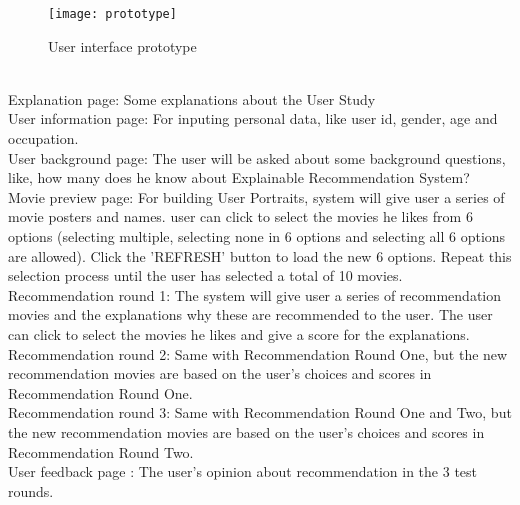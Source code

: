 \begin{figure}[h]
\caption{User interface prototype}
\label{figure:12}
\centering
\texttt{[image: prototype]}
\end{figure}
\leavevmode\\
Explanation page: Some explanations about the User Study \\
User information page: For inputing personal data, like user id, gender, age and occupation.\\
User background page: The user will be asked about some background questions, like, how many does he know about Explainable Recommendation System?\\
Movie preview page: For building User Portraits, system will give user a series of movie posters and names. user can click to select the movies he likes from 6 options (selecting multiple, selecting none in 6 options and selecting all 6 options are allowed). Click the 'REFRESH' button to load the new 6 options. Repeat this selection process until the user has selected a total of 10 movies. \\
Recommendation round 1: The system will give user a series of recommendation movies and the explanations why these are recommended to the user. The user can click to select the movies he likes and give a score for the explanations. \\
Recommendation round 2: Same with Recommendation Round One, but the new recommendation movies are based on the user's choices and scores in Recommendation Round One. \\
Recommendation round 3: Same with Recommendation Round One and Two, but the new recommendation movies are based on the user's choices and scores in Recommendation Round Two. \\
User feedback page : The user's opinion about recommendation in the 3 test rounds.


\cleardoublepage